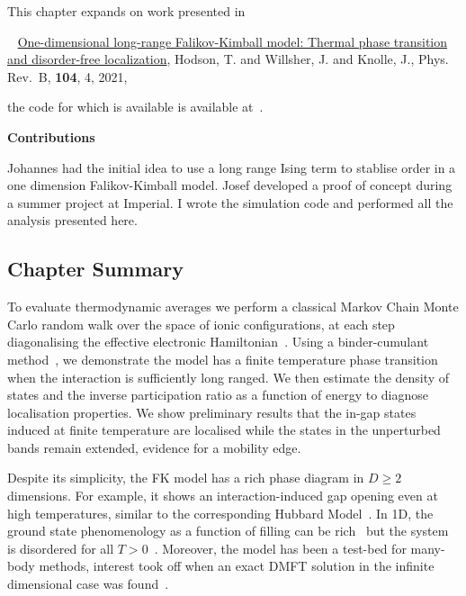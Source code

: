 This chapter expands on work presented in

~\autocite{hodsonOnedimensionalLongrangeFalikovKimball2021} \href{https://link.aps.org/doi/10.1103/PhysRevB.104.045116}{One-dimensional long-range Falikov-Kimball model: Thermal phase transition and disorder-free localization}, Hodson, T. and Willsher, J. and Knolle, J., Phys. Rev.~B, \textbf{104}, 4, 2021,

the code for which is available is available at~\autocite{hodsonMCMCFKModel2021}.

\textbf{Contributions}

Johannes had the initial idea to use a long range Ising term to stablise order in a one dimension Falikov-Kimball model. Josef developed a proof of concept during a summer project at Imperial. I wrote the simulation code and performed all the analysis presented here.

\hypertarget{chapter-summary}{%
\subsection{Chapter Summary}\label{chapter-summary}}

To evaluate thermodynamic averages we perform a classical Markov Chain Monte Carlo random walk over the space of ionic configurations, at each step diagonalising the effective electronic Hamiltonian~\autocite{maskaThermodynamicsTwodimensionalFalicovKimball2006}. Using a binder-cumulant method~\autocite{binderFiniteSizeScaling1981,musialMonteCarloSimulations2002}, we demonstrate the model has a finite temperature phase transition when the interaction is sufficiently long ranged. We then estimate the density of states and the inverse participation ratio as a function of energy to diagnose localisation properties. We show preliminary results that the in-gap states induced at finite temperature are localised while the states in the unperturbed bands remain extended, evidence for a mobility edge.

Despite its simplicity, the FK model has a rich phase diagram in \(D \geq 2\) dimensions. For example, it shows an interaction-induced gap opening even at high temperatures, similar to the corresponding Hubbard Model~\autocite{brandtThermodynamicsCorrelationFunctions1989}. In 1D, the ground state phenomenology as a function of filling can be rich~\autocite{gruberGroundStatesSpinless1990} but the system is disordered for all \(T > 0\)~\autocite{kennedyItinerantElectronModel1986}. Moreover, the model has been a test-bed for many-body methods, interest took off when an exact DMFT solution in the infinite dimensional case was found~\autocite{antipovCriticalExponentsStrongly2014,ribicNonlocalCorrelationsSpectral2016,freericksExactDynamicalMeanfield2003,herrmannNonequilibriumDynamicalCluster2016}.

